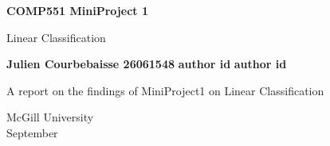 \documentclass[11pt]{article}
\begin{document}
\begin{center}
       \vspace*{1cm}
 
       \textbf{\huge COMP551 MiniProject 1}
 
       \vspace{0.5cm}
        Linear Classification
 
       \vspace{1.5cm}
 
       \textbf{Julien Courbebaisse 26061548} \linebreak
	\textbf{author id}\linebreak
	\textbf{author id}
 
       \vfill
 
       A report on the findings of MiniProject1 on Linear Classification
 
       \vspace{0.8cm}
 
 
       McGill University\\
       September 
\end{center}
\end{document}
